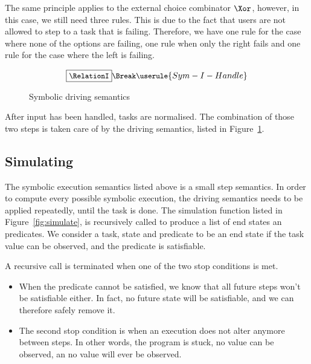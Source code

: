 The same principle applies to the external choice combinator $\Xor$, however, in this case, we still need three rules.
This is due to the fact that users are not allowed to step to a task that is failing.
Therefore, we have one rule for the case where none of the options are failing, one rule when only the right fails and one rule for the case where the left is failing.


\begin{figure}
\begin{gather*}
  \small
  \boxed{\RelationI}\Break
  \userule{Sym-I-Handle}
\end{gather*}
\caption{Symbolic driving semantics}
\label{fig:driving}
\end{figure}

After input has been handled, tasks are normalised.
The combination of those two steps is taken care of by the driving semantics, listed in Figure~\ref{fig:driving}.


\subsection{Simulating}
\label{subsec:driving}

The symbolic execution semantics listed above is a small step semantics.
In order to compute every possible symbolic execution, the driving semantics needs to be applied repeatedly, until the task is done.
The simulation function listed in Figure~\ref{fig:simulate}, is recursively called to produce a list of end states an predicates.
We consider a task, state and predicate to be an end state if the task value can be observed, and the predicate is satisfiable.

A recursive call is terminated when one of the two stop conditions is met.

\begin{itemize}
  \item When the predicate cannot be satisfied, we know that all future steps won't be satisfiable either.
  In fact, no future state will be satisfiable, and we can therefore safely remove it.
  \item The second stop condition is when an execution does not alter anymore between steps.
  In other words, the program is stuck, no value can be observed, an no value will ever be observed.
\end{itemize}


